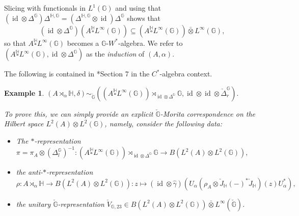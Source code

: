\documentclass[reqno]{amsart}
\numberwithin{equation}{section}
\newtheorem{Exa}[Theorem]{Example}
\DeclareMathOperator{\id}{\mathrm{id}}
\newcommand{\G}{\mathbb{G}}
\newcommand{\ovot}{\bar{\otimes}}
\begin{document}
Slicing with functionals in $L^1(\G)$ and using that $(\id \otimes \Delta^\G)\Delta^{\mathbb{H}, \G}= (\Delta^{\mathbb{H}, \G}\otimes \id)\Delta^\G$ shows that $$(\id \otimes \Delta^\G)(A \overset{\mathbb{H}}{\square} L^\infty(\G))\subseteq (A \overset{\mathbb{H}}{\square} L^\infty(\G))\ovot L^\infty(\G),$$ so that $A \overset{\mathbb{H}}{\square} L^\infty(\G)$ becomes a $\G$-$W^*$-algebra. We refer to $(A \overset{\mathbb{H}}{\square} L^\infty(\G), \id \otimes \Delta^\G)$ as the \emph{induction} of $(A, \alpha)$.

The following is contained in \cite{Vae05}*{Section 7} in the $C^*$-algebra context.
 \begin{Exa}\label{example closed}
     $(A\rtimes_{\alpha}\mathbb{H}, \delta)\sim_{\check{\G}} ((A \overset{\mathbb{H}}{\square} L^\infty(\G)) \rtimes_{\id \otimes \Delta^\G} \G, \id \otimes \id \otimes \check{\Delta}_r^\G).$

To prove this, we can simply provide an explicit $\check{\G}$-Morita correspondence on the Hilbert space $L^2(A)\otimes L^2(\G)$, namely, consider the following data:
\begin{itemize}\setlength\itemsep{-0.5em}
    \item The $*$-representation $\pi= \pi_A\otimes (\Delta_l^{\G})^{-1}: (A \overset{\mathbb{H}}{\square} L^\infty(\G))\rtimes_{\id \otimes \Delta^\G}\G \to B(L^2(A)\otimes L^2(\G)),$
    \item the anti-$*$-representation $\rho: A\rtimes_\alpha \mathbb{H}\to B(L^2(A)\otimes L^2(\G)): z \mapsto (\id \otimes \hat{\gamma})(U_\alpha(\rho_A\otimes \check{J}_{\mathbb{H}}(-)^*\check{J}_{\mathbb{H}})(z)U_\alpha^*),$
    \item the unitary $\check{\G}$-representation $\check{V}_{\G,23}\in B(L^2(A)\otimes L^2(\G))\ovot L^\infty(\check{\G})$.
\end{itemize}


\end{Exa}
\end{document}
